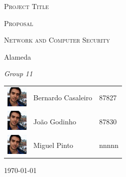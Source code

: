 \documentclass[a4paper,titlepage,11pt]{article}
\begin{document}
\begin{titlepage}
\begin{center}
  {\scshape \huge Project Title \par}                                                                         %
  \vspace{1cm}

  {\scshape \LARGE Proposal \par}
  \vspace{1.5cm}

  {\scshape \Large Network and Computer Security \par}
  \vspace{0.5cm}

  {\Large Alameda \par}
  \vfill

  {\itshape \Large Group 11 \par}
  \vfill

\begin{tabular}{l l l}
  \includegraphics[width=10mm, height=10mm]{img/bernardo.jpeg} & Bernardo Casaleiro & 87827\\
  \includegraphics[width=10mm, height=10mm]{img/bernardo.jpeg} & João Godinho & 87830\\                       %
  \includegraphics[width=10mm, height=10mm]{img/bernardo.jpeg} & Miguel Pinto & nnnnn\\                       %
\end{tabular}
  \vfill

{\large \today\par}
\end{center}
\end{titlepage}
\end{document}
